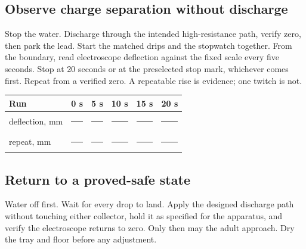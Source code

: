 {\subsection{Observe charge separation without discharge}
Stop the water. Discharge through the intended high-resistance path, verify
zero, then park the lead. Start the matched drips and the stopwatch together.
From the boundary, read electroscope deflection against the fixed scale every
five seconds. Stop at 20 seconds or at the preselected stop mark, whichever
comes first. Repeat from a verified zero. A repeatable rise is evidence; one
twitch is not.

\begin{center}
\small
\begin{tabular}{@{}lccccc@{}}
\toprule
Run & 0 s & 5 s & 10 s & 15 s & 20 s\\
\midrule
deflection, mm & \rule{1.0cm}{.3pt} & \rule{1.0cm}{.3pt}
 & \rule{1.0cm}{.3pt} & \rule{1.0cm}{.3pt} & \rule{1.0cm}{.3pt}\\
repeat, mm & \rule{1.0cm}{.3pt} & \rule{1.0cm}{.3pt}
 & \rule{1.0cm}{.3pt} & \rule{1.0cm}{.3pt} & \rule{1.0cm}{.3pt}\\
\bottomrule
\end{tabular}
\end{center}

\subsection{Return to a proved-safe state}
Water off first. Wait for every drop to land. Apply the designed discharge
path without touching either collector, hold it as specified for the apparatus,
and verify the electroscope returns to zero. Only then may the adult approach.
Dry the tray and floor before any adjustment.}

\def\explanation{The hydraulic control shows that both sides began with similar
water flow. During the isolated runs, a growing electroscope deflection shows
that charge accumulated even though no battery was connected and no spark was
allowed. A minute accidental imbalance polarizes the falling water. Each
charged collector biases the opposite stream through its induction ring, so
the imbalance reinforces itself. The falling water supplies the energy; the
cross-coupling supplies positive feedback.

\medskip
\noindent\textbf{Interrogate the evidence.}
Did both repeated runs rise from zero? Was the direction consistent, or did the
apparatus choose either sign? Could unequal drip rates explain the result?
Which observation distinguishes feedback from a single charged object:
continued growth, reversal after swapping a connection, or one initial jump?}

